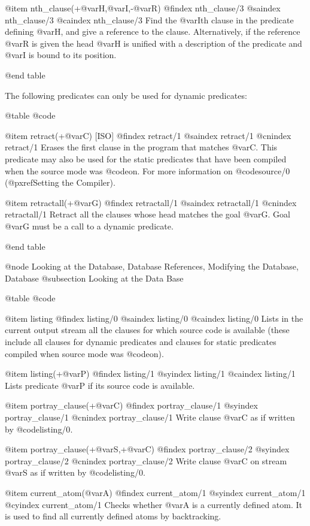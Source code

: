 {{{{{{@item nth_clause(+@var{H},@var{I},-@var{R})
@findex nth_clause/3
@saindex nth_clause/3
@caindex nth_clause/3
Find the @var{I}th clause in the predicate defining @var{H}, and give
a reference to the clause. Alternatively, if the reference @var{R} is
given the head @var{H} is unified with a description of the predicate
and @var{I} is bound to its position.

@end table

The following predicates can only be used for dynamic predicates:

@table @code

@item retract(+@var{C}) [ISO]
@findex retract/1
@saindex retract/1
@cnindex retract/1
Erases the first clause in the program that matches @var{C}. This
predicate may also be used for the static predicates that have been
compiled when the source mode was @code{on}. For more information on
@code{source/0} (@pxref{Setting the Compiler}).

@item retractall(+@var{G})
@findex retractall/1
@saindex retractall/1
@cnindex retractall/1
Retract all the clauses whose head matches the goal @var{G}. Goal
@var{G} must be a call to a dynamic predicate.

@end table

@node Looking at the Database, Database References, Modifying the Database, Database
@subsection Looking at the Data Base

@table @code

@item listing
@findex listing/0
@saindex listing/0
@caindex listing/0
Lists in the current output stream all the clauses for which source code
is available (these include all clauses for dynamic predicates and
clauses for static predicates compiled when source mode was @code{on}).

@item listing(+@var{P})
@findex listing/1
@syindex listing/1
@caindex listing/1
Lists predicate @var{P} if its source code is available.

@item portray_clause(+@var{C})
@findex portray_clause/1
@syindex portray_clause/1
@cnindex portray_clause/1
Write clause @var{C} as if written by @code{listing/0}.

@item portray_clause(+@var{S},+@var{C})
@findex portray_clause/2
@syindex portray_clause/2
@cnindex portray_clause/2
Write clause @var{C} on stream @var{S} as if written by @code{listing/0}.

@item current_atom(@var{A})
@findex current_atom/1
@syindex current_atom/1
@cyindex current_atom/1
Checks whether @var{A} is a currently defined atom. It is used to find all
currently defined atoms by backtracking.

}}}}}}
